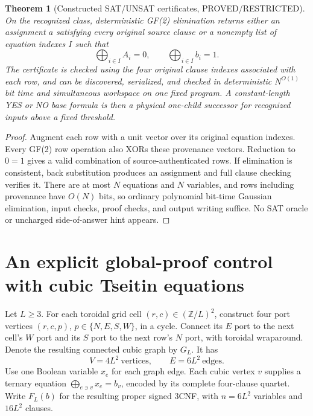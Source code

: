\documentclass[11pt]{article}
\newtheorem{theorem}{Theorem}
\begin{document}
\begin{theorem}[Constructed SAT/UNSAT certificates, PROVED/RESTRICTED]
On the recognized class, deterministic GF(2) elimination returns either an
assignment $a$ satisfying every original source clause or a nonempty list
of equation indexes $I$ such that
\[
 \bigoplus_{i\in I}A_i=0,\qquad
 \bigoplus_{i\in I}b_i=1.
\]
The certificate is checked using the four original clause indexes associated
with each row, and can be discovered, serialized, and checked in deterministic
$N^{O(1)}$ bit time and simultaneous workspace on one fixed program.  A
constant-length YES or NO base formula is then a physical one-child successor
for recognized inputs above a fixed threshold.
\end{theorem}
\begin{proof}
Augment each row with a unit vector over its original equation indexes.
Every GF(2) row operation also XORs these provenance vectors.  Reduction to
$0=1$ gives a valid combination of source-authenticated rows.  If elimination
is consistent, back substitution produces an assignment and full clause
checking verifies it.  There are at most $N$ equations and $N$ variables,
and rows including provenance have $O(N)$ bits, so ordinary polynomial
bit-time Gaussian elimination, input checks, proof checks, and output writing
suffice.  No SAT oracle or uncharged side-of-answer hint appears.
\end{proof}

\section{An explicit global-proof control with cubic Tseitin equations}
Let $L\ge3$.  For each toroidal grid cell $(r,c)\in(\mathbb Z/L)^2$,
construct four port vertices $(r,c,p)$, $p\in\{N,E,S,W\}$, in a cycle.
Connect its $E$ port to the next cell's $W$ port and its $S$ port to the
next row's $N$ port, with toroidal wraparound.  Denote the resulting
connected cubic graph by $G_L$.  It has
\[
 V=4L^2\ \text{vertices},\qquad E=6L^2\ \text{edges}.
\]
Use one Boolean variable $x_e$ for each graph edge.  Each cubic vertex
$v$ supplies a ternary equation
$\bigoplus_{e\ni v}x_e=b_v$, encoded by its complete four-clause quartet.
Write $F_L(b)$ for the resulting proper signed 3CNF, with
$n=6L^2$ variables and $16L^2$ clauses.
\end{document}
